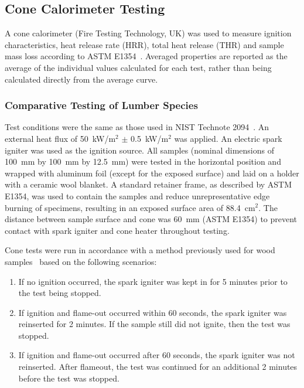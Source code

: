 \documentclass[12pt]{article}
\begin{document}
\subsection{Cone Calorimeter Testing}
\label{ssec:cone_testing}
A cone calorimeter (Fire Testing Technology, UK) was used to measure ignition characteristics, heat release rate (HRR), total heat release (THR) and sample mass loss according to ASTM E1354~\cite{astm_e1354}. Averaged properties are reported as the average of the individual values calculated for each test, rather than being calculated directly from the average curve.

\subsubsection{Comparative Testing of Lumber Species}
\label{sssec:comparative}
Test conditions were the same as those used in NIST Technote 2094~\cite{dubrulle2020effect}. An external heat flux of 50~kW/m$^{2}$ $\pm$ 0.5~kW/m$^{2}$ was applied. An electric spark igniter was used as the ignition source. All samples (nominal dimensions of 100~mm by 100~mm by 12.5~mm) were tested in the horizontal position and wrapped with aluminum foil (except for the exposed surface) and laid on a holder with a ceramic wool blanket. A standard retainer frame, as described by ASTM E1354, was used to contain the samples and reduce unrepresentative edge burning of specimens, resulting in an exposed surface area of 88.4~cm$^{2}$. The distance between sample surface and cone was 60~mm (ASTM E1354) to prevent contact with spark igniter and cone heater throughout testing.

Cone tests were run in accordance with a method previously used for wood samples~\cite{dubrulle2020effect} based on the following scenarios:

\begin{enumerate}
    \item If no ignition occurred, the spark igniter was kept in for 5 minutes prior to the test being stopped.
    \item If ignition and flame-out occurred within 60 seconds, the spark igniter was reinserted for 2 minutes. If the sample still did not ignite, then the test was stopped.
    \item If ignition and flame-out occurred after 60 seconds, the spark igniter was not reinserted. After flameout, the test was continued for an additional 2 minutes before the test was stopped.
\end{enumerate}
\end{document}
